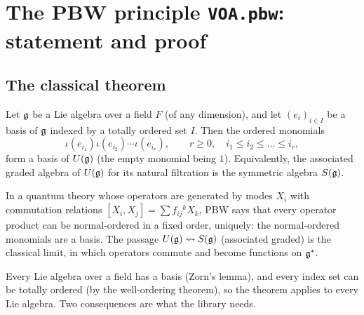\section{The PBW principle \texorpdfstring{\texttt{VOA.pbw}}{VOA.pbw}: statement and proof}\label{l02:sec:axiom}

\subsection{The classical theorem}

\begin{theorem}\label{l02:thm:pbw}
Let $\mathfrak{g}$ be a Lie algebra over a field $F$ (of any dimension), and let $(e_i)_{i\in I}$ be a
basis of $\mathfrak{g}$ indexed by a totally ordered set $I$. Then the ordered monomials
\begin{equation*}
 \iota(e_{i_1})\iota(e_{i_2})\cdots\iota(e_{i_r}),\qquad r\ge0,\quad i_1\le i_2\le\dots\le i_r,
\end{equation*}
form a basis of $U(\mathfrak{g})$ (the empty monomial being $1$). Equivalently, the associated graded
algebra of $U(\mathfrak{g})$ for its natural filtration is the symmetric algebra $S(\mathfrak{g})$.
\end{theorem}

\begin{physics}
In a quantum theory whose operators are generated by modes $X_i$ with commutation relations
$[X_i,X_j] = \sum f_{ij}{}^kX_k$, PBW says that every operator product can be normal-ordered in a
fixed order, uniquely: the normal-ordered monomials are a basis. The passage $U(\mathfrak{g})\leadsto S(\mathfrak{g})$
(associated graded) is the classical limit, in which operators commute and become functions on $\mathfrak{g}^*$.
\end{physics}

Every Lie algebra over a field has a basis (Zorn's lemma), and every index set can be totally
ordered (by the well-ordering theorem), so the theorem applies to every Lie algebra. Two
consequences are what the library needs.

